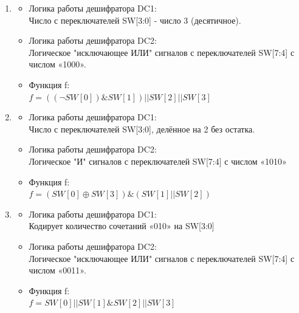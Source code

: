 \begin{enumerate}
    \item{
    \begin{itemize}
    \item Логика работы дешифратора DC1: \\
      Число с переключателей SW[3:0]  - число 3 (десятичное).
    \item Логика работы дешифратора DC2: \\ 
      Логическое "исключающее ИЛИ" сигналов с переключателей SW[7:4] с числом «1000».
    \item Функция f:\\
      $f = ((\neg SW[0]) \& SW[1]) || SW[2] || SW[3]$
    \end{itemize}
  }

    \item{
    \begin{itemize}
    \item Логика работы дешифратора DC1: \\
      Число с переключателей SW[3:0], делённое на 2 без остатка.
    \item Логика работы дешифратора DC2: \\ 
      Логическое "И" сигналов с переключателей SW[7:4] с числом «1010»
    \item Функция f:\\
      $f = (SW[0] \oplus SW[3]) \& (SW[1] || SW[2])$
    \end{itemize}
  }

    \item{
    \begin{itemize}
    \item Логика работы дешифратора DC1: \\
      Кодирует количество сочетаний «010» на SW[3:0]
    \item Логика работы дешифратора DC2: \\ 
      Логическое "исключающее ИЛИ" сигналов с переключателей SW[7:4] с числом «0011».
    \item Функция f:\\
      $f = SW[0] || SW[1] \& SW[2] || SW[3]$
    \end{itemize}
  }



\end{enumerate}